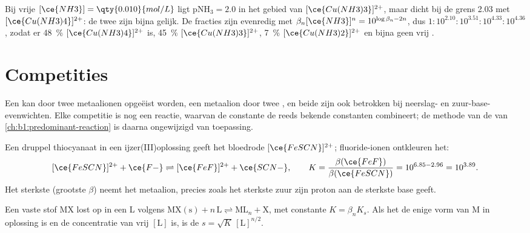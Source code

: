 \begin{example}\label{ex:b1:complexation:cu}
Bij vrije $[\ce{NH3}] = \qty{0.010}{mol/L}$ ligt $\mathrm{pNH_3} = 2.0$
in het gebied van $[\ce{Cu(NH3)3}]^{2+}$, maar dicht bij de grens 2.03 met
$[\ce{Cu(NH3)4}]^{2+}$: de twee zijn bijna gelijk. De fracties zijn
evenredig met $\beta_n[\ce{NH3}]^n = 10^{\log\beta_n - 2n}$, dus
$1 : 10^{2.10} : 10^{3.51} : 10^{4.33} : 10^{4.36}$, zodat er
\qty{48}{\percent}
$[\ce{Cu(NH3)4}]^{2+}$ is, \qty{45}{\percent} $[\ce{Cu(NH3)3}]^{2+}$,
\qty{7}{\percent} $[\ce{Cu(NH3)2}]^{2+}$ en bijna geen vrij .
\end{example}

\section{Competities}

Een  kan door twee metaalionen opgeëist worden, een metaalion door
twee , en beide zijn ook betrokken bij neerslag- en
zuur-base-evenwichten. Elke competitie is nog een reactie, waarvan de
constante de reeds bekende constanten combineert; de methode van de
 van \cref{ch:b1:predominant-reaction} is daarna
ongewijzigd van toepassing.

\begin{example}\label{ex:b1:complexation:scn-f}
Een druppel thiocyanaat in een ijzer(III)oplossing geeft het bloedrode
$[\ce{FeSCN}]^{2+}$; fluoride-ionen ontkleuren het:
\[
  [\ce{FeSCN}]^{2+} + \ce{F-} \rightleftharpoons [\ce{FeF}]^{2+} + \ce{SCN-},
  \qquad K = \frac{\beta(\ce{FeF})}{\beta(\ce{FeSCN})} = 10^{6.85 - 2.96} =
  10^{3.89} .
\]
Het sterkste  (grootste $\beta$) neemt het metaalion, precies
zoals het sterkste zuur zijn proton aan de sterkste base geeft.
\end{example}

\begin{proposition}\label{prop:b1:complexation:competition-precipitation}
Een vaste stof MX lost op in een  L volgens
$\mathrm{MX(s)} + n\,\mathrm{L} \rightleftharpoons \mathrm{ML}_n + \mathrm{X}$,
met constante $K = \beta_n K_s$. Als het  de enige vorm van M in
oplossing is en de concentratie van vrij  $[\mathrm{L}]$ is, is de
 $s = \sqrt{K}\,[\mathrm{L}]^{n/2}$.
\end{proposition}

